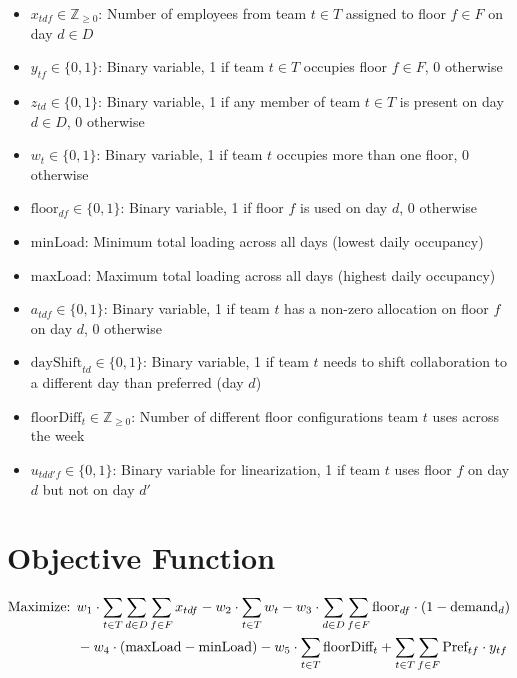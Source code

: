 \documentclass[12pt,a4paper]{article}
\begin{document}
\begin{itemize}
\item $x_{tdf} \in \mathbb{Z}_{\geq 0}$: Number of employees from team $t \in T$ assigned to floor $f \in F$ on day $d \in D$
\item $y_{tf} \in \{0, 1\}$: Binary variable, 1 if team $t \in T$ occupies floor $f \in F$, 0 otherwise
\item $z_{td} \in \{0, 1\}$: Binary variable, 1 if any member of team $t \in T$ is present on day $d \in D$, 0 otherwise
\item $w_t \in \{0, 1\}$: Binary variable, 1 if team $t$ occupies more than one floor, 0 otherwise
\item $\text{floor}_{df} \in \{0, 1\}$: Binary variable, 1 if floor $f$ is used on day $d$, 0 otherwise
\item $\text{minLoad}$: Minimum total loading across all days (lowest daily occupancy)
\item $\text{maxLoad}$: Maximum total loading across all days (highest daily occupancy)
\item $a_{tdf} \in \{0, 1\}$: Binary variable, 1 if team $t$ has a non-zero allocation on floor $f$ on day $d$, 0 otherwise
\item $\text{dayShift}_{td} \in \{0, 1\}$: Binary variable, 1 if team $t$ needs to shift collaboration to a different day than preferred (day $d$)
\item $\text{floorDiff}_t \in \mathbb{Z}_{\geq 0}$: Number of different floor configurations team $t$ uses across the week
\item $u_{tdd'f} \in \{0, 1\}$: Binary variable for linearization, 1 if team $t$ uses floor $f$ on day $d$ but not on day $d'$
\end{itemize}

\section{Objective Function}

\begin{align}
\text{Maximize: } & w_1 \cdot \sum_{t\in T} \sum_{d\in D} \sum_{f\in F} x_{tdf} - w_2 \cdot \sum_{t\in T} w_t - w_3 \cdot \sum_{d\in D} \sum_{f\in F} \text{floor}_{df} \cdot (1 - \text{demand}_d) \notag \\
& - w_4 \cdot (\text{maxLoad} - \text{minLoad}) - w_5 \cdot \sum_{t\in T} \text{floorDiff}_t + \sum_{t\in T} \sum_{f\in F} \text{Pref}_{tf} \cdot y_{tf}
\end{align}
\end{document}
